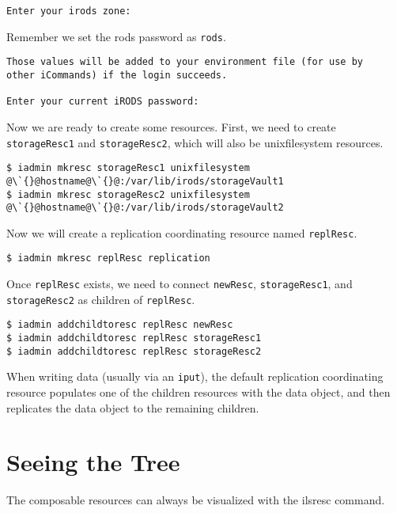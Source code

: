 \documentclass[10pt,oneside]{memoir}
\begin{document}
\begin{lstlisting}[basicstyle=\scriptsize\ttfamily]
Enter your irods zone:
\end{lstlisting}

\newpage

Remember we set the rods password as \texttt{rods}.

\begin{lstlisting}[basicstyle=\scriptsize\ttfamily]
Those values will be added to your environment file (for use by
other iCommands) if the login succeeds.

Enter your current iRODS password:
\end{lstlisting}

Now we are ready to create some resources. First, we need to create \texttt{storageResc1} and \texttt{storageResc2}, which will also be unixfilesystem resources.

\begin{lstlisting}[basicstyle=\scriptsize\ttfamily]
$ iadmin mkresc storageResc1 unixfilesystem @\`{}@hostname@\`{}@:/var/lib/irods/storageVault1
$ iadmin mkresc storageResc2 unixfilesystem @\`{}@hostname@\`{}@:/var/lib/irods/storageVault2
\end{lstlisting}

Now we will create a replication coordinating resource named \texttt{replResc}.

\begin{lstlisting}
$ iadmin mkresc replResc replication
\end{lstlisting}

Once \texttt{replResc} exists, we need to connect \texttt{newResc}, \texttt{storageResc1}, and \texttt{storageResc2} as children of \texttt{replResc}.

\begin{lstlisting}
$ iadmin addchildtoresc replResc newResc
$ iadmin addchildtoresc replResc storageResc1
$ iadmin addchildtoresc replResc storageResc2
\end{lstlisting}

When writing data (usually via an \texttt{iput}), the default replication coordinating resource populates one of the children resources with the data object, and then replicates the data object to the remaining children.

\section{Seeing the Tree}

The composable resources can always be visualized with the ilsresc command.
\end{document}

